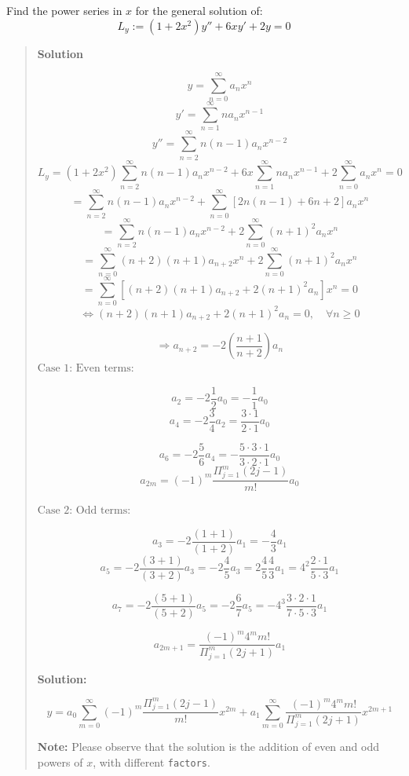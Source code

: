 \documentclass[
  letterpaper,
  DIV=11,
  numbers=noendperiod]{scrreprt}
\theoremstyle{plain}
\theoremstyle{remark}
\begin{document}
\begin{tcolorbox}[enhanced jigsaw, title=\textcolor{quarto-callout-tip-color}{\faLightbulb}\hspace{0.5em}{Example}, colbacktitle=quarto-callout-tip-color!10!white, opacitybacktitle=0.6, opacityback=0, rightrule=.15mm, breakable, titlerule=0mm, colback=white, bottomtitle=1mm, colframe=quarto-callout-tip-color-frame, toprule=.15mm, leftrule=.75mm, toptitle=1mm, arc=.35mm, bottomrule=.15mm, left=2mm, coltitle=black]

Find the power series in \(x\) for the general solution of:
\[L_y:=(1+2x^2)y''+6xy'+2y=0\]

\begin{quote}
\textbf{Solution}

\[y=\sum_{n=0}^\infty a_nx^n\] \[y'=\sum_{n=1}^\infty na_nx^{n-1}\]
\[y''=\sum_{n=2}^\infty n(n-1)a_nx^{n-2}\]
\[L_y=(1+2x^2)\sum_{n=2}^\infty n(n-1)a_nx^{n-2}+6x\sum_{n=1}^\infty na_nx^{n-1}+2\sum_{n=0}^\infty a_nx^n=0\]
\[=\sum_{n=2}^\infty n(n-1)a_nx^{n-2}+\sum_{n=0}^\infty[2n(n-1)+6n+2]a_nx^n\]
\[=\sum_{n=2}^\infty n(n-1)a_nx^{n-2}+2\sum_{n=0}^\infty(n+1)^2a_nx^n\]
\[=\sum_{n=0}^\infty (n+2)(n+1)a_{n+2}x^{n}+2\sum_{n=0}^\infty(n+1)^2a_nx^n\]
\[=\sum_{n=0}^\infty \left[(n+2)(n+1)a_{n+2}+2(n+1)^2a_n\right]x^n=0\]
\[\Leftrightarrow (n+2)(n+1)a_{n+2}+2(n+1)^2a_n=0,\quad\forall n\geq 0\]

\[\Rightarrow \boxed{a_{n+2}=-2\left(\frac{n+1}{n+2}\right)a_n}\]
\(\boxed{\text{Case 1: Even terms: }}\)

\[a_2=-2\frac{1}{2}a_0=-\frac{1}{1}a_0\]
\[a_4=-2\frac{3}{4}a_2=\frac{3\cdot 1}{2\cdot 1}a_0\]

\[a_6=-2\frac{5}{6}a_4=-\frac{5\cdot 3\cdot 1}{3\cdot 2\cdot 1}a_0\]
\[a_{2m}=(-1)^m\frac{\Pi_{j=1}^m (2j-1)}{m!}a_0\]

\(\boxed{\text{Case 2: Odd terms: }}\)

\[a_3=-2\frac{(1+1)}{(1+2)}a_1=-\frac{4}{3}a_1\]
\[a_5=-2\frac{(3+1)}{(3+2)}a_3=-2\frac{4}{5}a_3=2\frac{4}{5}\frac{4}{3}a_1=4^2\frac{2\cdot 1}{5\cdot 3}a_1\]

\[a_7=-2\frac{(5+1)}{(5+2)}a_5=-2\frac{6}{7}a_5=-4^3\frac{3\cdot 2\cdot 1}{7\cdot 5\cdot 3}a_1\]

\[a_{2m+1}=\frac{(-1)^m4^mm!}{\Pi_{j=1}^m(2j+1)}a_1\]

\textbf{Solution:}

\[\boxed{y=a_0\sum_{m=0}^\infty (-1)^m\frac{\Pi_{j=1}^m(2j-1)}{m!}x^{2m}+a_1\sum_{m=0}^\infty\frac{(-1)^m4^mm!}{\Pi_{j=1}^m(2j+1)}x^{2m+1}}\]

\textbf{Note:} Please observe that the solution is the addition of even
and odd powers of \(x\), with different \texttt{factors}.
\end{quote}

\end{tcolorbox}
\end{document}

